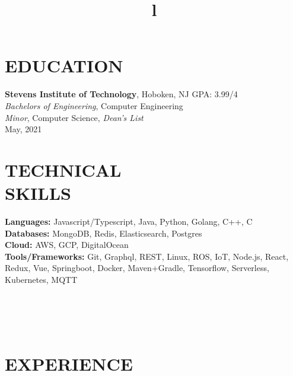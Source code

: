 \documentclass[margin]{res}
\begin{document}
\begin{resume}


\section{EDUCATION}
\textbf{Stevens Institute of Technology}, Hoboken, NJ \hfill GPA: 3.99/4\\
{\sl Bachelors of Engineering}, Computer Engineering\\
{\sl Minor}, Computer Science, {\sl Dean's List}\\
May, 2021

\section{TECHNICAL\\SKILLS}

\textbf{Languages:} Javascript/Typescript, Java, Python, Golang, C++, C
\\
\textbf{Databases:} MongoDB, Redis, Elasticsearch, Postgres
\\
\textbf{Cloud:} AWS, GCP, DigitalOcean
\\
\textbf{Tools/Frameworks:} Git, Graphql, REST, Linux, ROS, IoT, Node.js,
React, Redux, Vue, Springboot, Docker, Maven+Gradle, Tensorflow,
Serverless, Kubernetes, MQTT

\begin{format}
\title{l}\\
\\
\body\\
\end{format}

\section{EXPERIENCE}


\end{resume}
\end{document}
